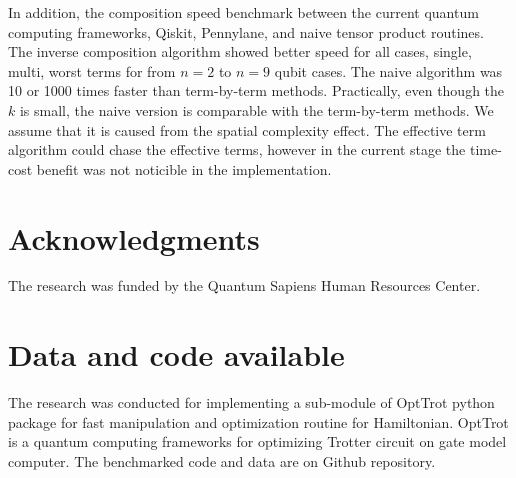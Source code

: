 \documentclass[twocolumn]{article}
\begin{document}
In addition, the composition speed benchmark between the current quantum computing frameworks, Qiskit, Pennylane, and naive
tensor product routines. 
The inverse composition algorithm showed better speed for all cases, single, multi, worst terms 
for from $n=2$ to $n=9$ qubit cases. 
The naive algorithm was 10 or 1000 times faster than term-by-term methods.
Practically, even though the $k$ is small, the naive version is comparable 
with the term-by-term methods. 
We assume that it is caused from the spatial complexity effect.
The effective term algorithm could chase the effective terms, however in the current stage the time-cost benefit 
was not noticible in the implementation.

\section*{Acknowledgments}
The research was funded by the Quantum Sapiens Human Resources Center.

\section*{Data and code available}
The research was conducted for implementing a sub-module of OptTrot python package for 
fast manipulation and optimization routine for Hamiltonian.
OptTrot is a quantum computing frameworks for optimizing Trotter circuit on gate model computer.
The benchmarked code and data are on Github repository\cite{kim_2024_TPC}.
  
  

\appendix
%
%
%
%
%
\end{document}
